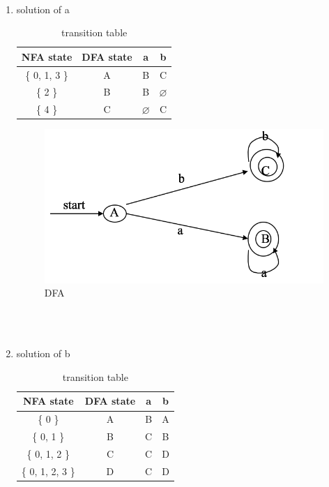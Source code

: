 \documentclass[12pt,a4paper]{article}
\makeatletter
\newtheorem*{solution}{Solution}
\renewenvironment{solution}[1][Solution] {\par\pushQED{\qed}\normalfont\topsep6\p@\@plus6\p@\relax\trivlist\item[\hskip\labelsep\bfseries#1\@addpunct{.}]\ignorespaces}{\popQED\endtrivlist\@endpefalse} \makeatother
\makeatother
\begin{document}
\begin{enumerate}
\begin{enumerate}
    \end{enumerate}

    \textrm{\\}
    \begin{enumerate}
    \item solution of a
    \begin{table}[h]
    \centering
    \begin{tabular}{|c|c|c|c|}
    \hline
    NFA state & DFA state & a & b\\
    \hline
    \{ 0, 1, 3 \} & A & B & C\\
    \hline
    \{ 2 \} & B & B & $\varnothing$\\
    \hline
    \{ 4 \} & C & $\varnothing$ & C\\
    \hline
    \end{tabular}
    \caption{transition table}
    \end{table}

    \begin{figure}[h]
    \center
    \includegraphics[width=0.8\linewidth]{sol1}\vspace{-10pt}
    \caption{DFA} \label{DFA}\vspace{-10pt}
    \end{figure}
    
    \newpage
    \textrm{\\}
    \textrm{\\}
    \item solution of b
    \textrm{\\}
    \begin{table}[h]
    \centering
    \begin{tabular}{|c|c|c|c|}
    \hline
    NFA state & DFA state & a & b\\
    \hline
    \{ 0 \} & A & B & A\\
    \hline
    \{ 0, 1 \} & B & C & B\\
    \hline
    \{ 0, 1, 2 \} & C & C & D\\
    \hline
    \{ 0, 1, 2, 3 \} & D & C & D\\
    \hline
    \end{tabular}
    \caption{transition table}
    \end{table}


\end{enumerate}
\end{enumerate}
\end{document}
